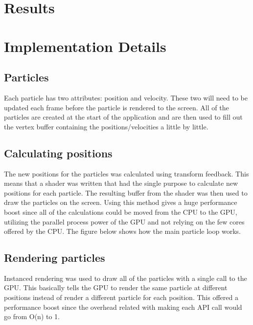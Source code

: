\documentclass[journal]{vgtc}                %
\begin{document}
	\section{Results}


	\section{Implementation Details}	
	
	\subsection{Particles}

Each particle has two attributes: position and velocity. These two will need to be updated each frame before the particle is rendered to the screen. All of the particles are created at the start of the application and are then used to fill out the vertex buffer containing the positions/velocities a little by little.


	\subsection{Calculating positions}
The new positions for the particles was calculated using transform feedback. This means that a shader was written that had the single purpose to calculate new positions for each particle. The resulting buffer from the shader was then used to draw the particles on the screen. Using this method gives a huge performance boost since all of the calculations could be moved from the CPU to the GPU, utilizing the parallel process power of the GPU and not relying on the few cores offered by the CPU.  The figure below shows how the main particle loop works.







	\subsection{Rendering particles}
Instanced rendering was used to draw all of the particles with a single call to the GPU. This basically tells the GPU to render the same particle at different positions instead of render a different particle for each position. This offered a performance boost since the overhead related with making each API call would go from O(n) to 1. 
\end{document}
